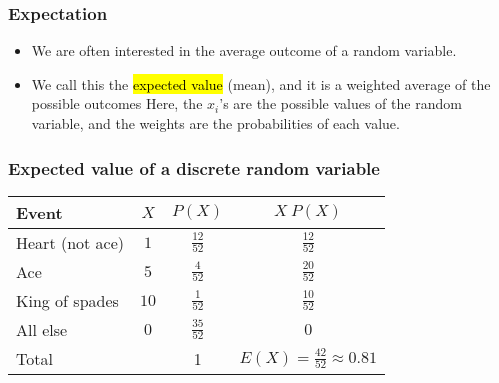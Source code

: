 \documentclass[slidestop,compress,mathserif]{beamer}
\begin{document}
\begin{frame}
\frametitle{Expectation}

\begin{itemize}

\item We are often interested in the average outcome of a random variable.

\item We call this the \hl{expected value} (mean), and it is a weighted average of the possible outcomes
\formula{\[\mu = E(X) = \sum_{i = 1}^k x_i ~ P(X = x_i)\]}
Here, the $x_i$'s are the possible values of the random variable, and the weights are the probabilities of each value.
\pause
{}
\end{itemize}

\end{frame}


\begin{frame}
\frametitle{Expected value of a discrete random variable}


\begin{center}
\renewcommand{\arraystretch}{1.5}
\begin{tabular}{l | c | c | c }
Event		& $X$ 		& $P(X)$        		& $X ~ P(X)$ \\
\hline
Heart (not ace)	& $1$		& $\frac{12}{52}$	& $\frac{12}{52}$ \\
Ace			& $5$		& $\frac{4}{52}$	& $\frac{20}{52}$ \\	
King of spades	& $10$		& $\frac{1}{52}$	& $\frac{10}{52}$ \\	
All else		& $0$		& $\frac{35}{52}$	& $0$ \\
\hline
Total			&			&		1		& $E(X) = \frac{42}{52} \approx 0.81$
\end{tabular}

\end{center}

\end{frame}
\end{document}
